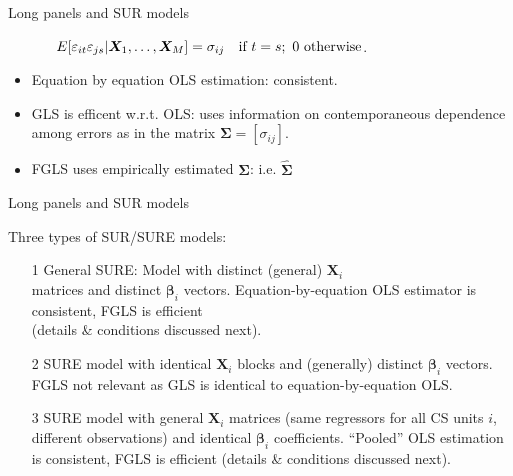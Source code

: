 \documentclass[usenames,dvipsnames]{beamer}
\begin{document}
\begin{frame}{Long panels and SUR models}
\begin{itemize}
\begin{itemize}
        $E[\varepsilon_{it} \varepsilon_{js} |\bm{X}_1,\dots,\bm{X}_M]=\sigma_{ij}~~~\textnormal{if}~t=s;~0~\textnormal{otherwise}$.
    \end{itemize}
    \medskip
    \item Equation by equation OLS estimation: consistent. \\
    \smallskip
    \item GLS is efficent w.r.t. OLS: uses information on contemporaneous dependence among errors as in the matrix $\bm{\Sigma}= [\sigma_{ij}]$.
    \smallskip 
    \item FGLS uses empirically estimated $\bm{\Sigma}$: i.e. $\bm{\hat{\Sigma}}$
\end{itemize}
\end{frame}
\begin{frame}{Long panels and SUR models}

Three types of SUR/SURE models:\\
\bigskip
    \begin{itemize}
        \item[1] General SURE:  Model with distinct (general) $\bm{X}_i$ \\matrices and distinct $\bm{\beta}_i$ vectors. Equation-by-equation OLS estimator is consistent, FGLS is efficient \\(details \& conditions discussed next).
        \bigskip   
        \item[2] SURE model with identical $\bm{X}_i$ blocks and (generally) distinct $\bm{\beta}_i$ vectors. FGLS not relevant as GLS is identical to equation-by-equation OLS. \\ 
        \bigskip
        \item[3] SURE model with  general $\bm{X}_i$ matrices (same regressors for all CS units $i$, different observations) and identical $\bm{\beta}_i$ coefficients. ``Pooled'' OLS estimation is consistent, FGLS is efficient (details \& conditions discussed next).\medskip
    \end{itemize}
\end{frame}
\end{document}
